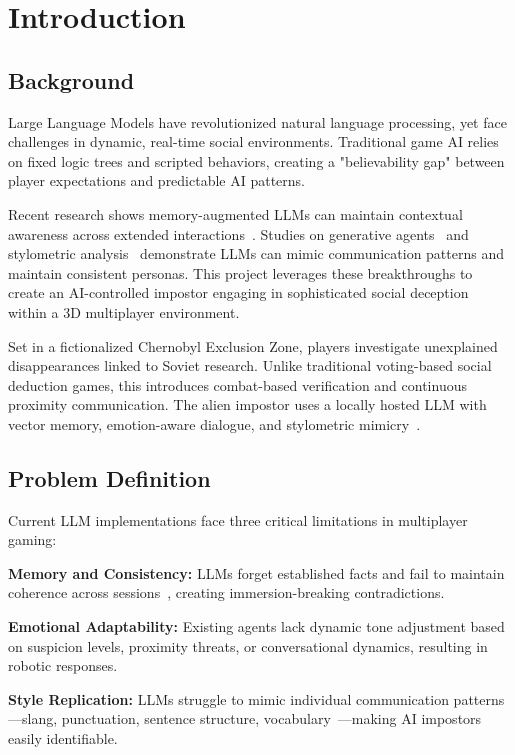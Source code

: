 \chapter{Introduction}

\section{Background}

Large Language Models have revolutionized natural language processing, yet face challenges in dynamic, real-time social environments. Traditional game AI relies on fixed logic trees and scripted behaviors, creating a "believability gap" between player expectations and predictable AI patterns.

Recent research shows memory-augmented LLMs can maintain contextual awareness across extended interactions~\cite{liu2022,wangw2024}. Studies on generative agents~\cite{park2023generative} and stylometric analysis~\cite{mikros2023} demonstrate LLMs can mimic communication patterns and maintain consistent personas. This project leverages these breakthroughs to create an AI-controlled impostor engaging in sophisticated social deception within a 3D multiplayer environment.

Set in a fictionalized Chernobyl Exclusion Zone, players investigate unexplained disappearances linked to Soviet research. Unlike traditional voting-based social deduction games, this introduces combat-based verification and continuous proximity communication. The alien impostor uses a locally hosted LLM with vector memory, emotion-aware dialogue, and stylometric mimicry~\cite{kolenbrander2023}.

\section{Problem Definition}

Current LLM implementations face three critical limitations in multiplayer gaming:

\textbf{Memory and Consistency:} LLMs forget established facts and fail to maintain coherence across sessions~\cite{wangy2024}, creating immersion-breaking contradictions.

\textbf{Emotional Adaptability:} Existing agents lack dynamic tone adjustment based on suspicion levels, proximity threats, or conversational dynamics, resulting in robotic responses.

\textbf{Style Replication:} LLMs struggle to mimic individual communication patterns—slang, punctuation, sentence structure, vocabulary~\cite{mikros2023}—making AI impostors easily identifiable.

